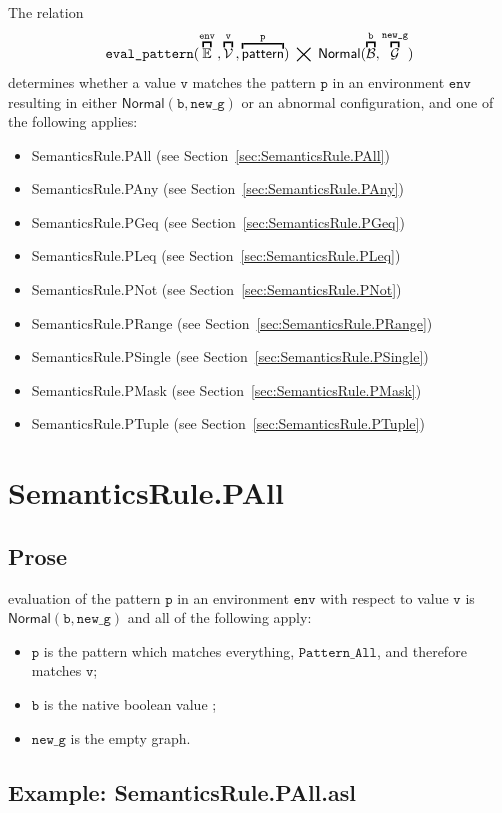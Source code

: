 \documentclass{book}
\newcommand\secref[1]{Section~\ref{sec:#1}}
\newcommand\overname[2]{\overbracket{#1}^{#2}}
\newcommand\XGraphs[0]{\mathcal{G}}
\newcommand\vals[0]{\mathcal{V}}
\newcommand\tbool[0]{\mathcal{B}}
\newcommand\aslrel[0]{\bigtimes}
\newcommand\aslsep[0]{\mathbf{,}}
\newcommand\evalpattern[1]{\texttt{eval\_pattern}(#1)}
\newcommand\Normal[0]{\textsf{Normal}}
\newcommand\env[0]{\texttt{env}}
\newcommand\newg[0]{\texttt{new\_g}}
\newcommand\vp[0]{\texttt{p}}
\newcommand\vv[0]{\texttt{v}}
\newcommand\vb[0]{\texttt{b}}
\begin{document}
The relation
\[
  \evalpattern{\overname{\envs}{\env} \aslsep \overname{\vals}{\vv} \aslsep \overname{\pattern}{\vp}} \;\aslrel\;
  \Normal(\overname{\tbool}{\vb}, \overname{\XGraphs}{\newg})
\]
determines whether a value $\vv$ matches the pattern $\vp$ in an environment $\env$
resulting in either $\Normal(\vb, \newg)$ or an abnormal configuration,
and one of the following applies:
\begin{itemize}
\item SemanticsRule.PAll (see \secref{SemanticsRule.PAll})
\item SemanticsRule.PAny (see \secref{SemanticsRule.PAny})
\item SemanticsRule.PGeq (see \secref{SemanticsRule.PGeq})
\item SemanticsRule.PLeq (see \secref{SemanticsRule.PLeq})
\item SemanticsRule.PNot (see \secref{SemanticsRule.PNot})
\item SemanticsRule.PRange (see \secref{SemanticsRule.PRange})
\item SemanticsRule.PSingle (see \secref{SemanticsRule.PSingle})
\item SemanticsRule.PMask (see \secref{SemanticsRule.PMask})
\item SemanticsRule.PTuple (see \secref{SemanticsRule.PTuple})
\end{itemize}

\section{SemanticsRule.PAll \label{sec:SemanticsRule.PAll}}
  \subsection{Prose}
  evaluation of the pattern $\vp$ in an environment $\env$ with
  respect to value $\vv$ is \\ $\Normal(\vb, \newg)$ and all of the following apply:
  \begin{itemize}
    \item $\vp$ is the pattern which matches everything, $\texttt{Pattern\_All}$, and therefore
      matches $\vv$;
    \item $\vb$ is the native boolean value \True;
    \item $\newg$ is the empty graph.
  \end{itemize}

  \subsection{Example: SemanticsRule.PAll.asl}
\end{document}
